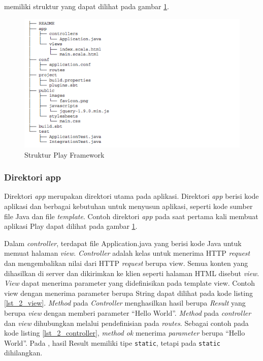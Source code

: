 \play memiliki struktur yang dapat dilihat pada gambar \ref{fig:2_play_struktur}.

\begin{figure}[H]
	\centering
	\includegraphics[scale=0.7]{Gambar/play-struktur}
	\caption{Struktur Play Framework \cite{playforjava}} 
	\label{fig:2_play_struktur}
\end{figure}

\subsubsection{Direktori app}
Direktori \textit{app} merupakan direktori utama pada aplikasi. Direktori \textit{app} berisi kode aplikasi dan berbagai kebutuhan untuk menyusun aplikasi, seperti kode sumber file Java dan file \textit{template}. Contoh direktori \textit{app} pada saat pertama kali membuat aplikasi Play dapat dilihat pada gambar \ref{fig:2_play_struktur}. 

Dalam \textit{controller}, terdapat file Application.java yang berisi kode Java untuk memuat halaman \textit{view}. \textit{Controller} adalah kelas untuk menerima HTTP \textit{request} dan mengembalikan nilai dari HTTP \textit{request} berupa view. Semua konten yang dihasilkan di server dan dikirimkan ke klien seperti halaman HTML disebut \textit{view}. \textit{View} dapat menerima parameter yang didefinisikan pada template view. Contoh view dengan menerima parameter berupa String dapat dilihat pada kode listing \ref{lst_2_view}. \textit{Method} pada \textit{Controller} menghasilkan hasil berupa \textit{Result} yang berupa \textit{view} dengan memberi parameter ``Hello World''. \textit{Method} pada \textit{controller} dan \textit{view} dihubungkan melalui pendefinisian pada \textit{routes}. Sebagai contoh pada kode listing \ref{lst_2_controller}, \textit{method ok} menerima \textit{parameter} berupa ``Hello World''. Pada \cite{playforjava}, hasil Result memiliki tipe \verb!static!, tetapi pada  \verb!static! dihilangkan.

